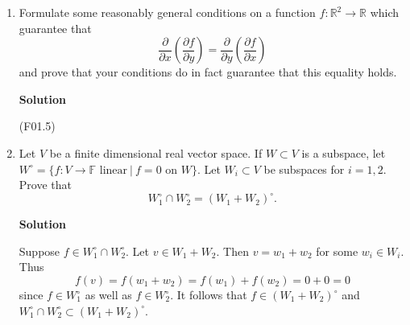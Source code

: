 \documentclass{article}
\newcommand{\matrixiibyii}[4]{\left( \begin{array}{cc} #1 & #2 \\ #3 & #4 \end{array} \right)}
\newcommand{\matrixiibyi}[2]{\left( \begin{array}{c} #1 \\ #2 \end{array} \right)}
\begin{document}
\begin{enumerate}
\begin{enumerate}
\end{enumerate}

{\bf Solution}

\begin{enumerate}
\item \(F\) is continuous on \(A\), which is compact, hence \(F\) achieves its maximum and minimum.

\item Let
\[g(x,y) = x^2 + y^2 - 1.\]
Then \(F\) achieves its maximum and minimum values whenever \((x,y) \in \mathbb{R}^2\) simultaneously satisfy
\[\nabla F(x,y) = \lambda \nabla g(x,y),\]
\[g(x,y) = 0\]
for some \(\lambda \in \mathbb{R}\).  Thus we compute
\[\nabla F(x,y) = (2ax + 2by, 2bx + 2cy),\]
\[\nabla g(x,y) = (2x, 2y),\]
and substituting into the first condition gives the system
\[2ax + 2by = 2\lambda x,\]
\[2bx + 2cy = 2\lambda y,\]
which is equivalent to
\[\matrixiibyii{a}{b}{b}{c} \matrixiibyi{x}{y} = \lambda \matrixiibyi{x}{y},\]
hence \(\matrixiibyi{x}{y}\) is an eigenvector of \(\matrixiibyii{a}{b}{b}{c}\).
\end{enumerate}



\item Formulate some reasonably general conditions on a function \(f : \mathbb{R}^2 \to \mathbb{R}\) which guarantee that
\[  \frac{\partial}{\partial x} \left( \frac{\partial f}{\partial y} \right)
  = \frac{\partial}{\partial y} \left( \frac{\partial f}{\partial x} \right)\]
and prove that your conditions do in fact guarantee that this equality holds.

{\bf Solution}

(F01.5)



\item Let \(V\) be a finite dimensional real vector space.  If \(W \subset V\) is a subspace, let \(W^{\circ} = \{f : V \to \mathbb{F} \text{ linear} \ | \ f = 0 \text{ on } W\}\).  Let \(W_i \subset V\) be subspaces for \(i = 1, 2\).  Prove that
\[W_1^{\circ} \cap W_2^{\circ} = (W_1 + W_2)^{\circ}.\]

{\bf Solution}

Suppose \(f \in W_1^{\circ} \cap W_2^{\circ}\).  Let \(v \in W_1 + W_2\).  Then \(v = w_1 + w_2\) for some \(w_i \in W_i\).  Thus
\[f(v) = f(w_1 + w_2) = f(w_1) + f(w_2) = 0 + 0 = 0\]
since \(f \in W_1^{\circ}\) as well as \(f \in W_2^{\circ}\).  It follows that \(f \in (W_1 + W_2)^{\circ}\) and \(W_1^{\circ} \cap W_2^{\circ} \subset (W_1 + W_2)^{\circ}\).


\end{enumerate}
\end{document}
